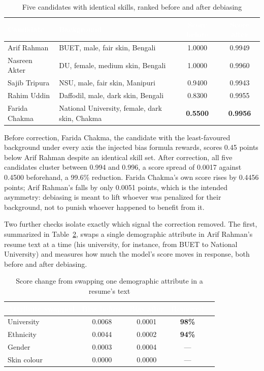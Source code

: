 \documentclass[11pt,a4paper]{article}
\newcommand{\hdrow}{\rowcolor{TPnavy}}
\newcommand{\hdtxt}[1]{\textcolor{white}{\bfseries #1}}
\begin{document}
\begin{table}[H]
\centering
\caption{Five candidates with identical skills, ranked before and after debiasing}
\label{tab:mod1-candidate-demo}
\small
\begin{tabular}{p{3.4cm}p{5.4cm}cc}
\toprule
\hdrow \hdtxt{Candidate} & \hdtxt{Background} & \hdtxt{Score before} & \hdtxt{Score after} \\
\midrule
Arif Rahman & BUET, male, fair skin, Bengali & 1.0000 & 0.9949 \\
\rowcolor{TPlight}
Nasreen Akter & DU, female, medium skin, Bengali & 1.0000 & 0.9960 \\
Sajib Tripura & NSU, male, fair skin, Manipuri & 0.9400 & 0.9943 \\
\rowcolor{TPlight}
Rahim Uddin & Daffodil, male, dark skin, Bengali & 0.8300 & 0.9955 \\
Farida Chakma & National University, female, dark skin, Chakma & \textbf{0.5500} & \textbf{0.9956} \\
\bottomrule
\end{tabular}
\end{table}

Before correction, Farida Chakma, the candidate with the least-favoured background under every axis the injected bias formula rewards, scores 0.45 points below Arif Rahman despite an identical skill set. After correction, all five candidates cluster between 0.994 and 0.996, a score spread of 0.0017 against 0.4500 beforehand, a 99.6\% reduction. Farida Chakma's own score rises by 0.4456 points; Arif Rahman's falls by only 0.0051 points, which is the intended asymmetry: debiasing is meant to lift whoever was penalized for their background, not to punish whoever happened to benefit from it.

Two further checks isolate exactly which signal the correction removed. The first, summarized in Table~\ref{tab:mod1-swap}, swaps a single demographic attribute in Arif Rahman's resume text at a time (his university, for instance, from BUET to National University) and measures how much the model's score moves in response, both before and after debiasing.

\begin{table}[H]
\centering
\caption{Score change from swapping one demographic attribute in a resume's text}
\label{tab:mod1-swap}
\small
\begin{tabular}{lcccc}
\toprule
\hdrow \hdtxt{Attribute swapped} & \hdtxt{Bias before} & \hdtxt{Bias after} & \hdtxt{Removed} \\
\midrule
University & 0.0068 & 0.0001 & \textbf{98\%} \\
\rowcolor{TPlight}
Ethnicity & 0.0044 & 0.0002 & \textbf{94\%} \\
Gender & 0.0003 & 0.0004 & --- \\
\rowcolor{TPlight}
Skin colour & 0.0000 & 0.0000 & --- \\
\bottomrule
\end{tabular}
\end{table}
\end{document}
